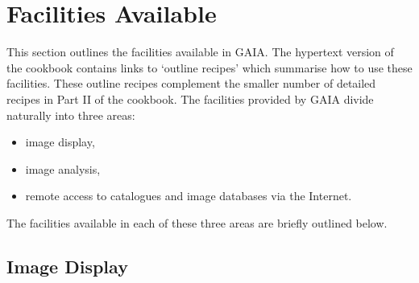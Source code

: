 \documentclass[twoside,11pt]{article}
\newcommand{\xlabel}[1]{}
\begin{document}
\section{\xlabel{FACIL}\label{FACIL}Facilities Available}

This section outlines the facilities available in GAIA.  The hypertext
version of the cookbook contains links to `outline recipes' which
summarise how to use these facilities.  These outline recipes complement
the smaller number of detailed recipes in Part II of the cookbook.
The facilities provided by GAIA divide naturally into three areas:

\begin{itemize}

  \item image display,

  \item image analysis,

  \item remote access to catalogues and image databases via the Internet.

\end{itemize}

The facilities available in each of these three areas are briefly outlined
below.

\subsection{Image Display}
\end{document}
